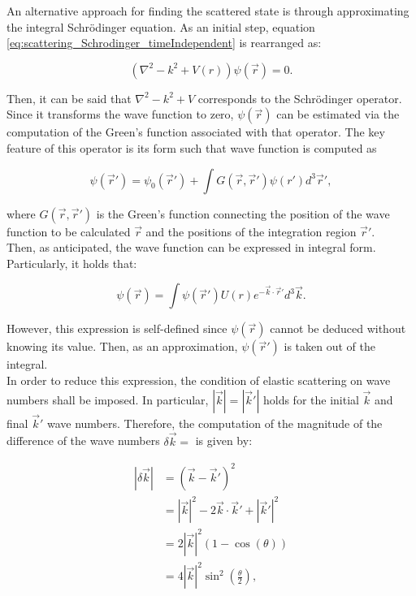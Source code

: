 \documentclass[openany]{book}
\begin{document}
An alternative approach for finding the scattered state is through approximating the integral Schrödinger equation. As an initial step, equation \ref{eq:scattering_Schrodinger_timeIndependent} is rearranged as:

\begin{equation} \label{eq:bornApproximation_operator}
 	(\nabla^2  - k^2 + V(r))\psi(\vec r) = 0.
\end{equation}

Then, it can be said that $\nabla^2  - k^2 + V$ corresponds to the Schrödinger operator. Since it transforms the wave function to zero,  $\psi(\vec r)$ can be estimated via the computation of the Green's function associated with that operator. The key feature of this operator is its form such that wave function is computed as 

\begin{equation} \label{eq:bornApproximation_greenFunction}
		\psi(\vec r') = \psi_0(\vec r') + \int {G(\vec r, \vec r') \psi(r') d^3\vec r'},
\end{equation}

where $G(\vec r, \vec r')$ is the Green's function connecting the position of the wave function to be calculated $\vec r$ and the positions of the integration region  $\vec r'$. \\

Then, as anticipated, the wave function can be expressed in integral form. Particularly, it holds that:

 \begin{equation} \label{eq:bornApproximation_equation}
 	\psi(\vec r) = \int{ \psi(\vec r' )U(r)e^{-\vec k \cdot \vec r'} d^3 \vec k}. 
 \end{equation}

However, this expression is self-defined since $\psi(\vec r) $ cannot be deduced without knowing its value. Then, as an approximation, $\psi(\vec r') $ is taken out of the integral.  \\

In order to reduce this expression, the condition of elastic scattering on wave numbers shall be imposed. In particular, $|\vec k| = |\vec k'| $ holds for the initial $\vec k$ and final $\vec k'$ wave numbers. Therefore, the computation of the magnitude of the difference of the wave numbers $\delta \vec k = $ is given by: 

\begin{equation} \label{eq:bornApproximation_waveNumber_difference}
	\begin{split}
	|\delta \vec k| &= (\vec k - \vec k')^2 \\
						   &= |\vec k|^2 - 2 \vec k \cdot  \vec k' + |\vec k'|^2 \\
						   &= 2|\vec k|^2(1 - \cos {(\theta)}) \\
						   &= 4 |\vec k|^2 \sin^2{\left(\frac{\theta}{2}\right)},
	\end{split}
\end{equation}
\end{document}
